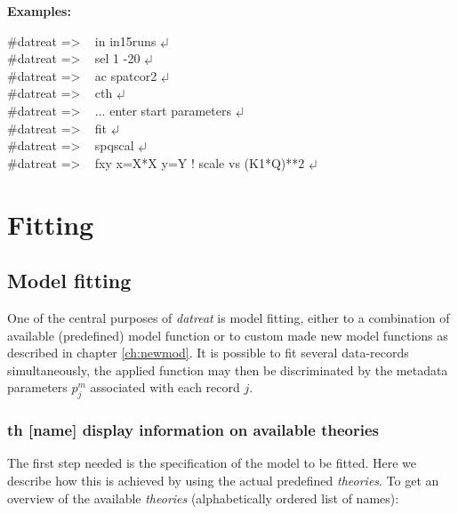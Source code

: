\documentclass[11pt,fleqn]{book} %
\newcommand{\linespace}{\vspace{4ex}}
\newcommand{\return}{$\carriagereturn$} %
\newcommand{\sysprompt}{{\color{green}...\textgreater} ~ }
\newcommand{\dtrprompt}{{\color{blue}\#datreat =\textgreater} ~ }
\newcommand{\enter}[1]{{\color{red} \bf #1}}
\newcommand{\opt}[1]{[#1]}
\newcommand{\desc}[1]{\hskip 0.5cm {\color{descgray} #1}}
\begin{document}
\linespace
{\bf Examples:}
\begin{corollary}
\dtrprompt in in15runs                       \return  \\
\dtrprompt sel 1 -20                         \return  \\
\dtrprompt ac spatcor2                       \return  \\
\dtrprompt cth                               \return  \\
\dtrprompt   ... enter start parameters      \return  \\
\dtrprompt fit                               \return  \\
\dtrprompt spqscal                           \return  \\
\dtrprompt fxy x=X*X y=Y  ! scale vs (K1*Q)**2                  \return  
\end{corollary}




\part{Fitting}

\chapter{Model fitting}

One of the central purposes of \emph{datreat} is model fitting, either to a combination of 
available (predefined) model function or to custom made new model functions as described 
in chapter \ref{ch:newmod}.
It is possible to fit several data-records simultaneously, the applied function may then be
discriminated by the metadata parameters ${p_j^m}$ associated with each record $j$. 

\section{th \opt{name}   \desc{display information on available theories}}
The first step needed is the specification of the model to be fitted. Here we describe how
this is achieved by using the actual predefined \emph{theories}.
\linespace
To get an overview of the available \emph{theories} (alphabetically ordered list of names):
\end{document}
